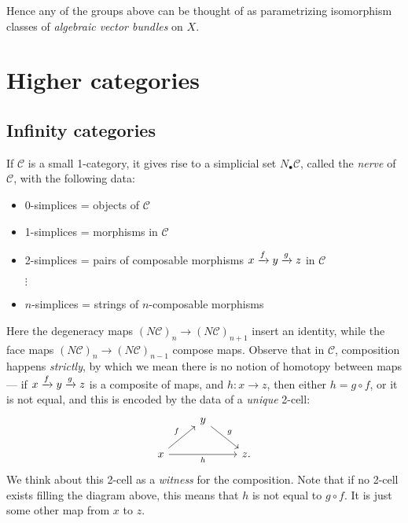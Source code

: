 \documentclass[11pt,openany]{book}
\begin{document}
Hence any of the groups above can be thought of as parametrizing isomorphism classes of \textit{algebraic vector bundles} on $X$.




\chapter{Higher categories}
\minitoc

\section{Infinity categories}

\begin{example} If $\mathscr{C}$ is a small 1-category, it gives rise to a simplicial set $N_\bullet \mathscr{C}$, called the \textit{nerve} of $\mathscr{C}$, with the following data:
\begin{itemize}
    \item 0-simplices = objects of $\mathscr{C}$
    \item 1-simplices = morphisms in $\mathscr{C}$
    \item 2-simplices = pairs of composable morphisms $x \xrightarrow{f} y \xrightarrow{g} z$ in $\mathscr{C}$
    \item[$\vdots$]
    \item $n$-simplices = strings of $n$-composable morphisms
\end{itemize}
Here the degeneracy maps $(N\mathscr{C})_n \to (N\mathscr{C})_{n+1}$ insert an identity, while the face maps $(N\mathscr{C})_n \to (N\mathscr{C})_{n-1}$ compose maps. Observe that in $\mathscr{C}$, composition happens \textit{strictly}, by which we mean there is no notion of homotopy between maps --- if $x \xrightarrow{f} y \xrightarrow{g} z$ is a composite of maps, and $h \colon x \to z$, then either $h = g\circ f$, or it is not equal, and this is encoded by the data of a \textit{unique} 2-cell:
\[ \begin{tikzcd}
     & y\ar[dr,"g" above right]\\
    x\ar[ur,"f" above left]\ar[rr,"h" below] &  & z.
\end{tikzcd} \]
We think about this 2-cell as a \textit{witness} for the composition. Note that if no 2-cell exists filling the diagram above, this means that $h$ is not equal to $g\circ f$. It is just some other map from $x$ to $z$.
\end{example}
\end{document}
